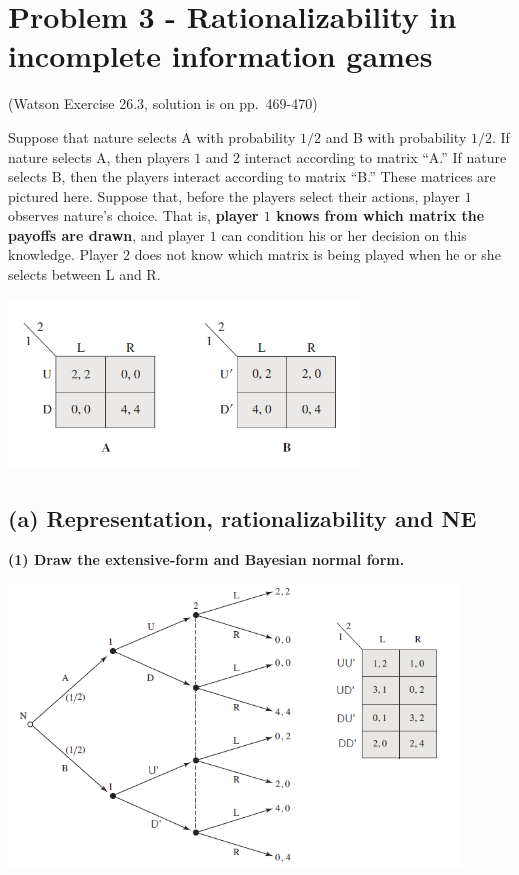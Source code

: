 \documentclass{article}
\begin{document}
\newpage

\section{Problem 3 - Rationalizability in incomplete information games}

(Watson Exercise 26.3, solution is on pp.~469-470)

Suppose that nature selects A with probability $1/2$ and B with probability
$1/2$. If nature selects A, then players $1$ and $2$ interact according to matrix
``A.'' If nature selects B, then the players interact according to matrix ``B.''
These matrices are pictured here. Suppose that, before the players select
their actions, player $1$ observes nature's choice. That is, \textbf{player $1$ knows
from which matrix the payoffs are drawn}, and player $1$ can condition his
or her decision on this knowledge. Player $2$ does not know which matrix is
being played when he or she selects between L and R.

\begin{center}
\includegraphics[width=0.7\textwidth]{9.q26_3}
\end{center}
\vspace{2mm}



\subsection*{(a) Representation, rationalizability and NE} 

\textbf{(1) Draw the extensive-form and Bayesian normal form. }

\begin{center}
\includegraphics[width=0.9\textwidth]{9.q26_3_a}
\end{center}
\vspace{2mm}
\end{document}
